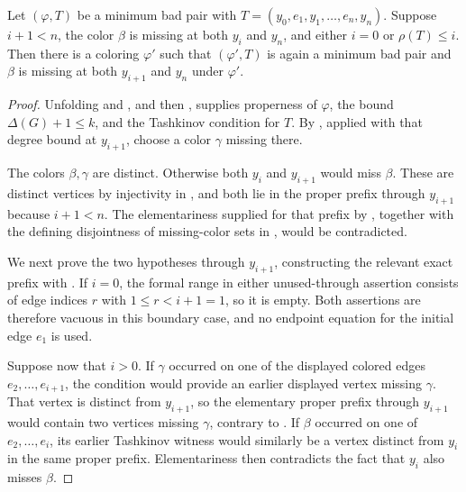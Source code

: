 \begin{helper}
Let \((\varphi,T)\) be a minimum bad pair with
\(T=(y_0,e_1,y_1,\ldots,e_n,y_n)\).  Suppose \(i+1<n\), the color
\(\beta\) is missing at both \(y_i\) and \(y_n\), and either \(i=0\)
or \(\rho(T)\leq i\).  Then there is a coloring \(\varphi'\) such that
\((\varphi',T)\) is again a minimum bad pair and \(\beta\) is missing
at both \(y_{i+1}\) and \(y_n\) under \(\varphi'\).
\end{helper}
\begin{proof}
Unfolding  and
, and then , supplies
properness of \(\varphi\), the bound
\(\Delta(G)+1\leq k\), and the Tashkinov condition for \(T\).
By , applied with that
degree bound at \(y_{i+1}\), choose a color \(\gamma\) missing there.

The colors \(\beta,\gamma\) are distinct.  Otherwise both \(y_i\) and
\(y_{i+1}\) would miss \(\beta\).  These are distinct vertices by
injectivity in , and both lie in the proper prefix
through \(y_{i+1}\) because \(i+1<n\).  The elementariness supplied for
that prefix by , together with
the defining disjointness of missing-color sets in
, would be contradicted.

We next prove the two  hypotheses
through \(y_{i+1}\), constructing the relevant exact prefix with
.  If \(i=0\), the formal range in either
unused-through assertion consists of edge indices \(r\) with
\(1\leq r<i+1=1\), so it is empty.  Both assertions are therefore
vacuous in this boundary case, and no endpoint equation for the initial
edge \(e_1\) is used.

Suppose now that \(i>0\).  If \(\gamma\) occurred on one of the
displayed colored edges \(e_2,\ldots,e_{i+1}\), the
 condition would provide an earlier displayed
vertex missing \(\gamma\).  That vertex is distinct from \(y_{i+1}\),
so the elementary proper prefix through \(y_{i+1}\) would contain two
vertices missing \(\gamma\), contrary to
.  If \(\beta\) occurred on one of
\(e_2,\ldots,e_i\), its earlier Tashkinov witness would similarly be a
vertex distinct from \(y_i\) in the same proper prefix.  Elementariness
then contradicts the fact that \(y_i\) also misses \(\beta\).


\end{proof}
